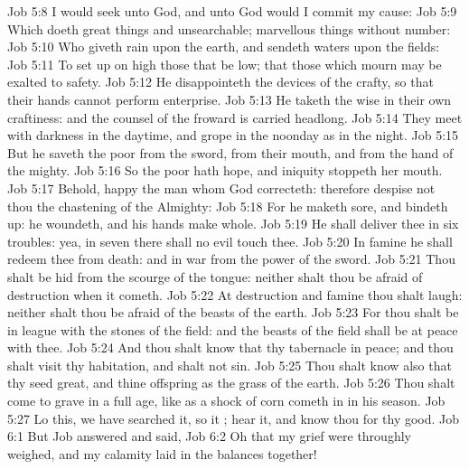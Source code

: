 \vs Job 5:8 I would seek unto God, and unto God would I commit my cause:
\vs Job 5:9 Which doeth great things and unsearchable; marvellous things without number:
\vs Job 5:10 Who giveth rain upon the earth, and sendeth waters upon the fields:
\vs Job 5:11 To set up on high those that be low; that those which mourn may be exalted to safety.
\vs Job 5:12 He disappointeth the devices of the crafty, so that their hands cannot perform  enterprise.
\vs Job 5:13 He taketh the wise in their own craftiness: and the counsel of the froward is carried headlong.
\vs Job 5:14 They meet with darkness in the daytime, and grope in the noonday as in the night.
\vs Job 5:15 But he saveth the poor from the sword, from their mouth, and from the hand of the mighty.
\vs Job 5:16 So the poor hath hope, and iniquity stoppeth her mouth.
\vs Job 5:17 Behold, happy  the man whom God correcteth: therefore despise not thou the chastening of the Almighty:
\vs Job 5:18 For he maketh sore, and bindeth up: he woundeth, and his hands make whole.
\vs Job 5:19 He shall deliver thee in six troubles: yea, in seven there shall no evil touch thee.
\vs Job 5:20 In famine he shall redeem thee from death: and in war from the power of the sword.
\vs Job 5:21 Thou shalt be hid from the scourge of the tongue: neither shalt thou be afraid of destruction when it cometh.
\vs Job 5:22 At destruction and famine thou shalt laugh: neither shalt thou be afraid of the beasts of the earth.
\vs Job 5:23 For thou shalt be in league with the stones of the field: and the beasts of the field shall be at peace with thee.
\vs Job 5:24 And thou shalt know that thy tabernacle  in peace; and thou shalt visit thy habitation, and shalt not sin.
\vs Job 5:25 Thou shalt know also that thy seed  great, and thine offspring as the grass of the earth.
\vs Job 5:26 Thou shalt come to  grave in a full age, like as a shock of corn cometh in in his season.
\vs Job 5:27 Lo this, we have searched it, so it ; hear it, and know thou  for thy good.
\vs Job 6:1 But Job answered and said,
\vs Job 6:2 Oh that my grief were throughly weig\-hed, and my calamity laid in the balances together!
